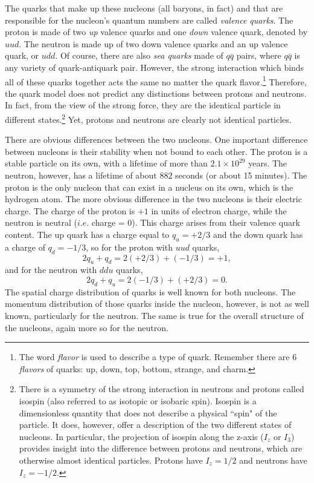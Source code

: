 The quarks that make up these nucleons (all baryons, in fact) and that are responsible for the nucleon's quantum numbers are called \textit{valence quarks}. The proton is made of two \textit{up} valence quarks and one \textit{down} valence quark, denoted by $uud$. The neutron is made up of two down valence quarks and an up valence quark, or $udd$. Of course, there are also \textit{sea quarks} made of $q\bar{q}$ pairs, where $q\bar{q}$ is any variety of quark-antiquark pair. However, the strong interaction which binds all of these quarks together acts the same no matter the quark flavor.\footnote{The word \textit{flavor} is used to describe a type of quark. Remember there are 6 \textit{flavors} of quarks: up, down, top, bottom, strange, and charm.} Therefore, the quark model does not predict any distinctions between protons and neutrons. In fact, from the view of the strong force, they are the identical particle in different states.\footnote{There is a symmetry of the strong interaction in neutrons and protons called isospin (also referred to as isotopic or isobaric spin). Isospin is a dimensionless quantity that does not describe a physical ``spin" of the particle. It does, however, offer a description of the two different states of nucleons. In particular, the projection of isospin along the z-axis ($I_z$ or $I_3$) provides insight into the difference between protons and neutrons, which are otherwise almost identical particles. Protons have $I_z=1/2$ and neutrons have $I_z=-1/2$.} Yet, protons and neutrons are clearly not identical particles.

There are obvious differences between the two nucleons. One important difference between nucleons is their stability when not bound to each other. The proton is a stable particle on its own, with a lifetime of more than $2.1 \times 10^{29}$ years. The neutron, however, has a lifetime of about $882$ seconds (or about 15 minutes). The proton is the only nucleon that can exist in a nucleus on its own, which is the hydrogen atom. The more obvious difference in the two nucleons is their electric charge. The charge of the proton is $+1$ in units of electron charge, while the neutron is neutral ($i.e.$ charge = 0). This charge arises from their valence quark content. The up quark has a charge equal to $q_u = +2/3$ and the down quark has a charge of $q_d = -1/3$, so for the proton with $uud$ quarks,
\begin{equation}
2q_u + q_d = 2(+2/3) + (-1/3) = +1,
\end{equation}
and for the neutron with $ddu$ quarks,
\begin{equation}
2q_d + q_u = 2(-1/3) + (+2/3) = 0.
\end{equation}
The spatial charge distribution of quarks is well known for both nucleons. The momentum distribution of those quarks inside the nucleon, however, is not as well known, particularly for the neutron. The same is true for the overall structure of the nucleons, again more so for the neutron.

